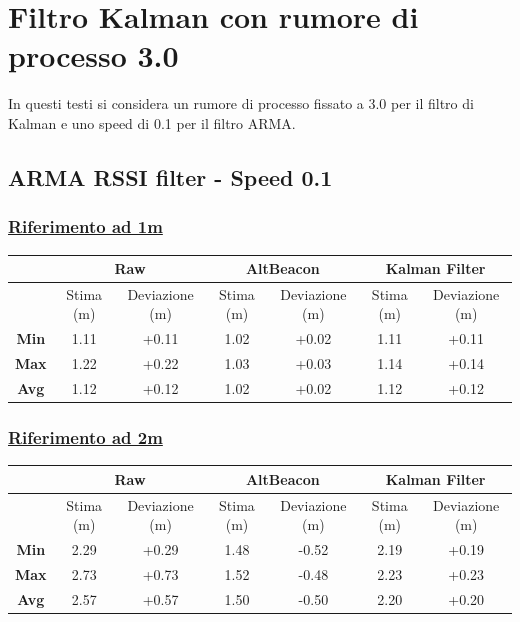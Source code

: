 \newpage
\section{Filtro Kalman con rumore di processo 3.0}

In questi testi si considera un rumore di processo fissato a 3.0 per il filtro di Kalman e uno speed di 0.1 per il filtro ARMA.

\subsection{ARMA RSSI filter - Speed 0.1}

\subsubsection{\underline{Riferimento ad 1m}}
\begin{center}
	\begin{tabular}{|c|c|c|c|c|c|c|}
		\hline 
		& \multicolumn{2}{|c|}{\textbf{Raw}} &\multicolumn{2}{|c|}{\textbf{AltBeacon}} &\multicolumn{2}{|c|}{\textbf{Kalman Filter}}\\ 
		\hline 
		& Stima (m) & Deviazione (m) & Stima (m) & Deviazione (m) & Stima (m)& Deviazione (m)\\ 
		\hline 
		\textbf{Min} & 1.11	& +0.11 & 1.02	& +0.02 & 1.11	& +0.11 \\ 
		\hline 
		\textbf{Max} & 1.22	& +0.22 & 1.03	& +0.03 & 1.14	& +0.14	\\ 
		\hline 
		\textbf{Avg} & 1.12	& +0.12 & 1.02 	& +0.02 & 1.12 	& +0.12	\\ 
		\hline 
	\end{tabular}
\end{center}

\subsubsection{\underline{Riferimento ad 2m}}
\begin{center}
	\begin{tabular}{|c|c|c|c|c|c|c|}
		\hline 
		& \multicolumn{2}{|c|}{\textbf{Raw}} &\multicolumn{2}{|c|}{\textbf{AltBeacon}} &\multicolumn{2}{|c|}{\textbf{Kalman Filter}}\\ 
		\hline 
		& Stima (m) & Deviazione (m) & Stima (m) & Deviazione (m) & Stima (m)& Deviazione (m)\\ 
		\hline 
		\textbf{Min} & 2.29	& +0.29 & 1.48	& -0.52 & 2.19	& +0.19 \\ 
		\hline 
		\textbf{Max} & 2.73	& +0.73 & 1.52	& -0.48 & 2.23	& +0.23	\\ 
		\hline 
		\textbf{Avg} & 2.57	& +0.57 & 1.50 	& -0.50 & 2.20 	& +0.20	\\ 
		\hline 
	\end{tabular}
\end{center}

